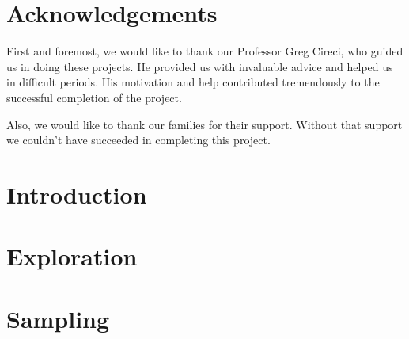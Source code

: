 \documentclass[12pt]{report}
\author{Tilemachos Kosmetsas \& Christos Koutkos}
\date{December 2021}
\begin{document}



\chapter*{Acknowledgements}
First and foremost, we would like to thank our Professor Greg Cireci, who guided us in doing these projects. He provided us with invaluable advice and helped us in difficult periods. His motivation and help contributed tremendously to the successful completion of the project.

Also, we would like to thank our families for their support. Without that support we couldn’t have succeeded in completing this project.

\tableofcontents

\listoffigures



\chapter{Introduction}


\chapter{Exploration}


\chapter{Sampling}




\printbibliography
\end{document}
